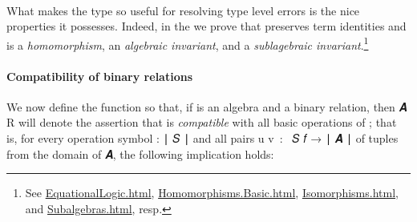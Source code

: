 \begin{code}
\\
%
\>[1]\AgdaSpace{}%
\AgdaSpace{}%
\AgdaSpace{}%
\AgdaSymbol{=}\AgdaSpace{}%
\AgdaSpace{}%
\AgdaSymbol{(}\AgdaSpace{}%
\AgdaSymbol{(}\AgdaSpace{}%
\AgdaSymbol{))}\AgdaSpace{}%
\AgdaSpace{}%
\AgdaSymbol{(}\AgdaSpace{}%
\AgdaSymbol{:}\AgdaSpace{}%
\AgdaSpace{}%
\AgdaSpace{}%
\AgdaSymbol{)}\AgdaSpace{}%
\AgdaSpace{}%
\AgdaSpace{}%
\AgdaSymbol{((}\AgdaSpace{}%
\AgdaSymbol{)}\AgdaSpace{}%
\AgdaSymbol{)}\AgdaSpace{}%
\AgdaSymbol{)}\<%
\end{code}
\ccpad
What makes the  type so useful for resolving type level errors is the nice properties it possesses. Indeed, in the \ualib we prove that  preserves term identities and is a \emph{homomorphism}, an \emph{algebraic invariant}, and a \emph{sublagebraic invariant}.\footnote{%
See \href{https://ualib.gitlab.io/Varieties.EquationalLogic.html\#lift-invariance}{EquationalLogic.html}, \href{https://ualib.gitlab.io/Homomorphisms.Basic.html\#exmples-of-homomorphisms}{Homomorphisms.Basic.html}, \href{https://ualib.gitlab.io/Homomorphisms.Isomorphisms.html\#lift-is-an-algebraic-invariant}{Isomorphisms.html}, and \href{https://ualib.gitlab.io/Subalgebras.Subalgebras.html\#lifts-of-subalgebras}{Subalgebras.html}, resp.}






\paragraph*{Compatibility of binary relations}\label{compatibility-of-binary-relations}

We now define the function  so that, if  is an algebra and  a binary relation, then  \ab 𝑨 \ab R will denote the assertion that  is \emph{compatible} with all basic operations of ; that is, for every operation symbol  \as : \af ∣ \ab 𝑆 \af ∣ and all pairs \ab u \ab v~\as :~ \ab 𝑆  \ab 𝑓 \as → \af ∣ \ab 𝑨 \af ∣ of tuples from the domain of \ab 𝑨, the following implication holds:\\[-8pt]

